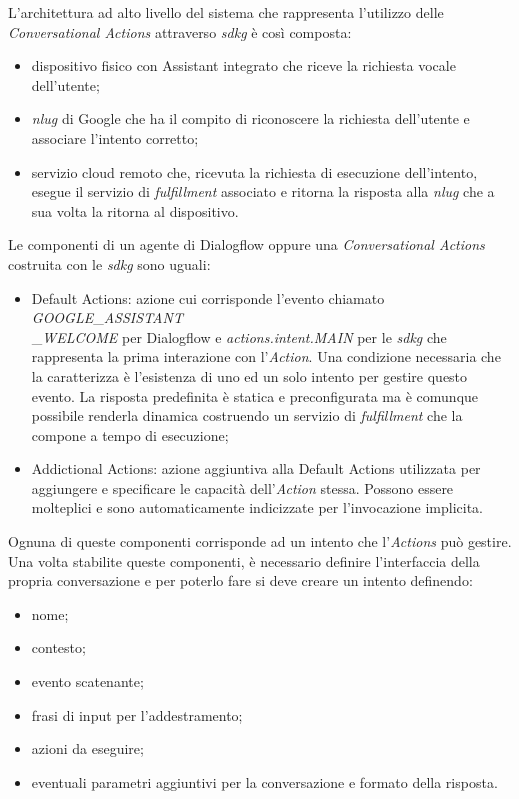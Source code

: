 		L'architettura ad alto livello del sistema che rappresenta l'utilizzo delle \emph{Conversational Actions} attraverso \emph{\gls{sdkg}} è così composta:
		\begin{itemize}
			\item dispositivo fisico con Assistant integrato che riceve la richiesta vocale dell'utente;
			\item \emph{\gls{nlug}} di Google che ha il compito di riconoscere la richiesta dell'utente e associare l'intento corretto;
			\item servizio cloud remoto che, ricevuta la richiesta di esecuzione dell'intento, esegue il servizio di \emph{fulfillment} associato e ritorna la risposta alla \emph{\gls{nlug}} che a sua volta la ritorna al dispositivo.
		\end{itemize}
		Le componenti di un agente di Dialogflow oppure una \emph{Conversational Actions} costruita con le \emph{\gls{sdkg}} sono uguali:
		\begin{itemize}
			\item Default Actions: azione cui corrisponde l'evento chiamato \textit{GOOGLE}\_\textit{ASSISTANT}\\ \_\textit{WELCOME} per Dialogflow e \textit{actions.intent.MAIN} per le \emph{\gls{sdkg}} che rappresenta la prima interazione con l'\emph{Action}. Una condizione necessaria che la caratterizza è l'esistenza di uno ed un solo intento per gestire questo evento. La risposta predefinita è statica e preconfigurata ma è comunque possibile renderla dinamica costruendo un servizio di \emph{fulfillment} che la compone a tempo di esecuzione;
			\item Addictional Actions: azione aggiuntiva alla Default Actions utilizzata per aggiungere e specificare le capacità dell'\emph{Action} stessa. Possono essere molteplici e sono automaticamente indicizzate per l'invocazione implicita.
		\end{itemize}
		Ognuna di queste componenti corrisponde ad un intento che l'\emph{Actions} può gestire. \\
		Una volta stabilite queste componenti, è necessario definire l'interfaccia della propria conversazione e per poterlo fare si deve creare un intento definendo:
		\begin{itemize}
			\item nome;
			\item contesto;
			\item evento scatenante;
			\item frasi di input per l'addestramento;
			\item azioni da eseguire;
			\item eventuali parametri aggiuntivi per la conversazione e formato della risposta.
		\end{itemize}
